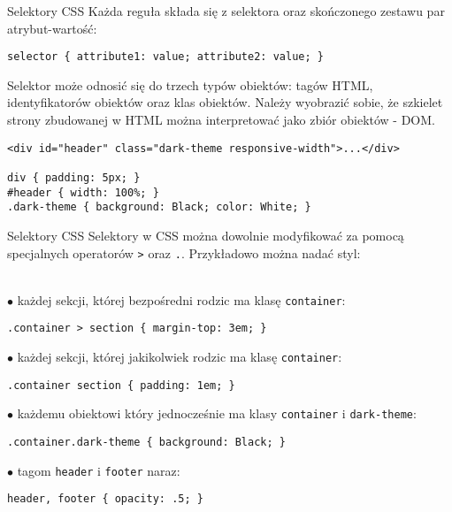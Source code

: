 \begin{frame}[fragile]{Selektory CSS}
	Każda reguła składa się z selektora oraz skończonego zestawu par atrybut-wartość:
	\begin{lstlisting}
selector { attribute1: value; attribute2: value; }
	\end{lstlisting}
	
	Selektor może odnosić się do trzech typów obiektów: tagów HTML, identyfikatorów obiektów oraz klas obiektów. Należy wyobrazić sobie, że szkielet strony zbudowanej w HTML można interpretować jako zbiór obiektów - DOM. 
	\begin{lstlisting}
<div id="header" class="dark-theme responsive-width">...</div>

div { padding: 5px; }
#header { width: 100%; }
.dark-theme { background: Black; color: White; }
	\end{lstlisting}
\end{frame}

\begin{frame}[fragile]{Selektory CSS}
	Selektory w CSS można dowolnie modyfikować za pomocą specjalnych operatorów \texttt{>} oraz  \texttt{.}. Przykładowo można nadać styl:
	
	\ \\
	
	$\bullet$ każdej sekcji, której bezpośredni rodzic ma klasę \texttt{container}:	
	\begin{lstlisting}
.container > section { margin-top: 3em; }
	\end{lstlisting}

	$\bullet$ każdej sekcji, której jakikolwiek rodzic ma klasę \texttt{container}:	
	\begin{lstlisting}
.container section { padding: 1em; }
	\end{lstlisting}

	$\bullet$ każdemu obiektowi który jednocześnie ma klasy \texttt{container} i \texttt{dark-theme}:
	\begin{lstlisting}
.container.dark-theme { background: Black; }
	\end{lstlisting}

	$\bullet$ tagom \texttt{header} i \texttt{footer} naraz:
	\begin{lstlisting}
header, footer { opacity: .5; }
	\end{lstlisting}
\end{frame}

